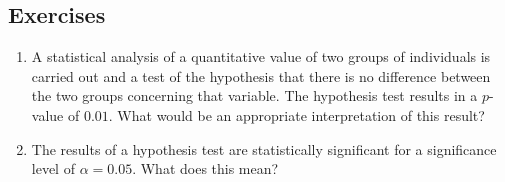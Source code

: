 \documentclass[
]{book}
\theoremstyle{definition}
\theoremstyle{definition}
\theoremstyle{definition}
\theoremstyle{definition}
\theoremstyle{remark}
\begin{document}
\hypertarget{exercises-71}{%
\subsection{Exercises}\label{exercises-71}}

\begin{enumerate}
\def\labelenumi{\arabic{enumi}.}
\item
  A statistical analysis of a quantitative value of two groups of individuals is carried out and a test of the hypothesis that there is no difference between the two groups concerning that variable. The hypothesis test results in a \(p\)-value of \(0.01\). What would be an appropriate interpretation of this result?
\item
  The results of a hypothesis test are statistically significant for a significance level of \(\alpha=0.05\). What does this mean?
\end{enumerate}

  
\end{document}
